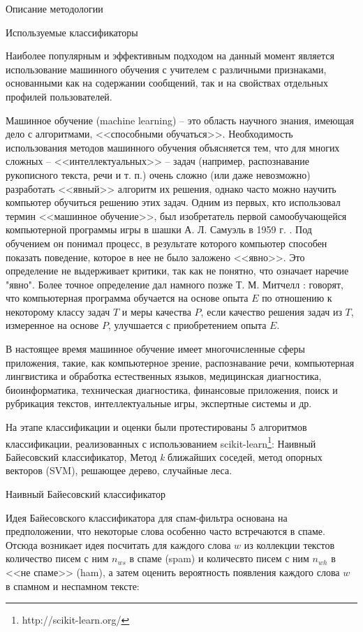 \begin{section}{Описание методологии}
  \begin{subsection}{Используемые классификаторы}

    Наиболее популярным и эффективным подходом на данный момент является использование машинного обучения с учителем с различными признаками, основанными как на содержании сообщений, так и на свойствах отдельных профилей пользователей.

    Машинное обучение (machine learning) – это область научного знания, имеющая дело с алгоритмами, <<способными обучаться>>. Необходимость использования методов машинного обучения объясняется тем, что для многих сложных – <<интеллектуальных>> – задач (например, распознавание рукописного текста, речи и т. п.) очень сложно (или даже невозможно) разработать <<явный>> алгоритм их решения, однако часто можно научить компьютер обучиться решению этих задач. Одним из первых, кто использовал термин <<машинное обучение>>, был изобретатель первой самообучающейся компьютерной программы игры в шашки А. Л. Самуэль в 1959 г. \cite{Samuel}. Под обучением он понимал процесс, в результате которого компьютер способен показать поведение, которое в нее не было заложено <<явно>>. Это определение не выдерживает критики, так как не понятно, что означает наречие "явно". Более точное определение дал намного позже Т. М. Митчелл \cite{Mitchell}: говорят, что компьютерная программа обучается на основе опыта $E$ по отношению к некоторому классу задач $T$ и меры качества $P$, если качество решения задач из $T$, измеренное на основе $P$, улучшается с приобретением опыта $E$.

    В настоящее время машинное обучение имеет многочисленные сферы приложения, такие, как компьютерное зрение, распознавание речи, компьютерная лингвистика и обработка естественных языков, медицинская диагностика, биоинформатика, техническая диагностика, финансовые приложения, поиск и рубрикация текстов, интеллектуальные игры, экспертные системы и др.


    На этапе классификации и оценки были протестированы 5 алгоритмов классификации, реализованных с использованием scikit-learn\footnote{http://scikit-learn.org/}: Наивный Байесовский классификатор,
    Метод \textit{k} ближайших соседей, метод опорных векторов (SVM), решающее дерево, случайные леса.

    \begin{subsubsection}{Наивный Байесовский классификатор}

Идея Байесовского классификатора для спам-фильтра основана на предположении,
что некоторые слова особенно часто встречаются в спаме. Отсюда возникает идея посчитать для каждого слова $w$ из коллекции текстов количество писем с ним $n_{ws}$
в спаме (spam) и количесвто писем с ним $n_{wh}$ в <<не спаме>> (ham), а затем оценить вероятность появления каждого слова $w$ в спамном и неспамном тексте:


\end{subsubsection}
\end{subsection}
\end{section}
